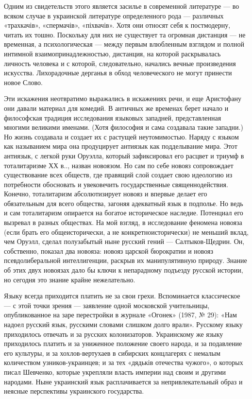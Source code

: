 Одним из свидетельств этого является засилье в современной литературе — во
всяком случае в украинской литературе определенного рода — различных
«трахкачів», «спермачів», «піхвачів». Хотя они относят себя к постмодерну,
читать их тошно. Поскольку для них не существует та огромная дистанция — не
временная, а психологическая — между первым влюбленным взглядом и полной
интимной взаимопринадлежностью, дистанция, на которой раскрывалась личность
человека и с которой, следовательно, начались вечные произведения искусства.
Лихорадочные дерганья в обход человеческого не могут принести новое Слово.

Эти искажения неотвратимо выражались в искажениях речи, и еще Аристофану они
давали материал для комедий. В античных же временах берет начало и философская
традиция исследования языковых западней, представленная многими великими
именами. (Хотя философия и сама создавала такие западни.) Но жизнь создавала и
создает их с растущей неутомимостью. Наряду с языком как называнием мира она
продуцирует антиязык как подделывание мира. Этот антиязык, с легкой руки
Оруэлла, который зафиксировал его расцвет и триумф в тоталитаризме ХХ в..,
назван новоязом. Но сам по себе новояз сопровождает существование всех обществ,
где правящий слой создает свою идеологию из потребности обосновать и
увековечить государственные священнодействия. Конечно, тоталитаризм
абсолютизирует новояз и впервые делает его обязательным для всего общества,
загоняя адекватный язык в подполье. Но ведь и сам тоталитаризм опирается на
богатое историческое наследие. Потенциал его вызревал в разных обществах. На
мой взгляд, в исследование феномена новояза (если брать его общеисторически, а
не конкретноисторически) не меньший вклад, чем Оруэлл, сделал полузабытый ныне
русский гений — Салтыков-Щедрин. Он, собственно, показал два новояза: новояз
царской бюрократии и новояз псевдолиберальной интеллигенции, раскрыв их
манипулятивную природу. Знание об этих двух новоязах дало бы ключи к
непарадному подъезду русской истории, но сегодня это знание крайне
нежелательно.

Языку всегда приходится платить не за свои грехи. Вспоминается классическое — с
этой точки зрения — заявление одной московской учительницы, опубликованное на
заре перестройки в журнале «Огонек» (1987, № 29): «Нам надоел русский язык,
русскими словами слишком долго врали». Русскому языку приходилось отвечать и за
русских колонизаторов. Украинскому же языку приходилось платить и за униженное
положение своего народа, и за подавление его культуры, и за хохлов-вертухаев в
сибирских концлагерях с немалым количеством узников-украинцев; и за тех
«дядьків отечества чужого», о которых писал Шевченко, которые укрепляли власть
империи над своим и другими народами. Ныне украинский язык расплачивается за
непривлекательный образ и неясные перспективы украинского государства.

